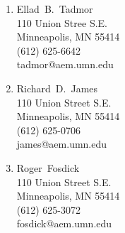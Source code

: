 \documentclass[numbers]{cv}
\begin{document}
\begin{references}
    \newline
    \begin{enumerate}
        \item
            Ellad~B.~Tadmor       \\
            110 Union Stree S.E.  \\
            Minneapolis, MN 55414 \\
            (612) 625-6642        \\
            tadmor@aem.umn.edu    
        \item
            Richard~D.~James       \\ 
            110 Union Street S.E.  \\
            Minneapolis, MN 55414  \\
            (612) 625-0706         \\
            james@aem.umn.edu      
        \item
            Roger~Fosdick         \\
            110 Union Street S.E. \\
            Minneapolis, MN 55414 \\
            (612) 625-3072        \\
            fosdick@aem.umn.edu
    \end{enumerate}
\end{references}
\end{document}
